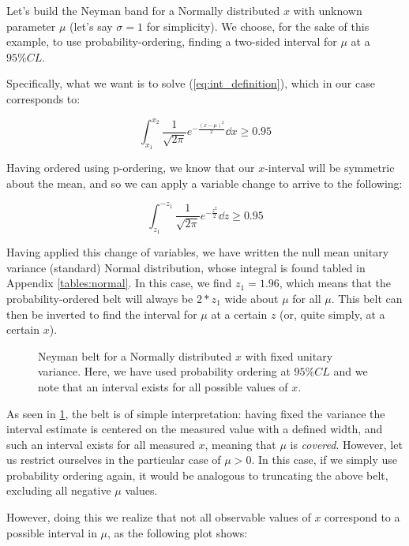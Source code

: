 \begin{example}
\label{ex:LR_vs_p_ordering}
	Let's build the Neyman band for a Normally distributed $x$ with unknown parameter $\mu$ (let's say $\sigma=1$ for simplicity). We choose, for the sake of this example, to use probability-ordering, finding a two-sided interval for $\mu$ at a $95\% CL$.
	
	Specifically, what we want is to solve (\ref{eq:int_definition}), which in our case corresponds to:
	
	\[
	\int_{x_1}^{x_2} \frac{1}{\sqrt{2\pi}}e^{-\frac{\left(x-\mu\right)^2}{2}}\dd x \geq 0.95
	\]
	
	
	
	Having ordered using p-ordering, we know that our $x$-interval will be symmetric about the mean, and so we can apply a variable change to arrive to the following:
	
	\[
	\int_{z_1}^{-z_1} \frac{1}{\sqrt{2\pi}}e^{-\frac{z^2}{2}}\dd z \geq 0.95
	\]
	
	Having applied this change of variables, we have written the null mean unitary variance (standard) Normal distribution, whose integral is found tabled in Appendix \ref{tables:normal}. In this case, we find $z_1 = 1.96$, which means that the probability-ordered belt will always be $2*z_1$ wide about $\mu$ for all $\mu$. This belt can then be inverted to find the interval for $\mu$ at a certain $z$ (or, quite simply, at a certain $x$).
	
	\begin{figure}[H]
		\centering
		
		\caption{Neyman belt for a Normally distributed $x$ with fixed unitary variance. Here, we have used probability ordering at $95\% CL$ and we note that an interval exists for all possible values of $x$.}
		\label{fig:neyman_gauss}
	\end{figure}
	
	As seen in \ref{fig:neyman_gauss}, the belt is of simple interpretation: having fixed the variance the interval estimate is centered on the measured value with a defined width, and such an interval exists for all measured $x$, meaning that $\mu$ is \emph{covered}. However, let us restrict ourselves in the particular case of $\mu>0$. In this case, if we simply use probability ordering again, it would be analogous to truncating the above belt, excluding all negative $\mu$ values.
	
	However, doing this we realize that not all observable values of $x$ correspond to a possible interval in $\mu$, as the following plot shows:
	

\end{example}
